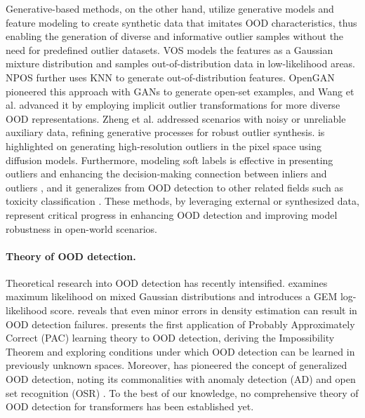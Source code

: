 \documentclass{article}
\theoremstyle{plain}
\theoremstyle{definition}
\theoremstyle{remark}
\begin{document}
Generative-based methods, on the other hand, utilize generative models and feature modeling to create synthetic data that imitates OOD characteristics, thus enabling the generation of diverse and informative outlier samples without the need for predefined outlier datasets. VOS \citep{du2022vos} models the features as a Gaussian mixture distribution and samples out-of-distribution data in low-likelihood areas. NPOS \citep{tao2023non} further uses KNN to generate out-of-distribution features. OpenGAN \citep{kong2021opengan} pioneered this approach with GANs to generate open-set examples, and Wang et al. \citep{wang2023out} advanced it by employing implicit outlier transformations for more diverse OOD representations. Zheng et al. \citep{zheng2023out} addressed scenarios with noisy or unreliable auxiliary data, refining generative processes for robust outlier synthesis. \citet{du2024dream} is highlighted on generating high-resolution outliers in the pixel space using diffusion models. 
Furthermore, modeling soft labels is effective in presenting outliers and enhancing the decision-making connection between inliers and outliers \citep{lang2022estimating, xu2024adaptive}, and it generalizes from OOD detection to other related fields such as toxicity classification \citep{cheng2024soft}.
These methods, by leveraging external or synthesized data, represent critical progress in enhancing OOD detection and improving model robustness in open-world scenarios.

\paragraph{Theory of OOD detection.}

Theoretical research into OOD detection has recently intensified. \citet{morteza2022provable} examines maximum likelihood on mixed Gaussian distributions and introduces a GEM log-likelihood score. \citet{zhang2021understanding} reveals that even minor errors in density estimation can result in OOD detection failures. \citet{fang2022out} presents the first application of Probably Approximately Correct (PAC) learning theory to OOD detection, deriving the Impossibility Theorem and exploring conditions under which OOD detection can be learned in previously unknown spaces. Moreover, \citet{yang2021generalized} has pioneered the concept of generalized OOD detection, noting its commonalities with anomaly detection (AD) and open set recognition (OSR) \citep{fang2021learning}. To the best of our knowledge, no comprehensive theory of OOD detection for transformers has been established yet. 
\end{document}
